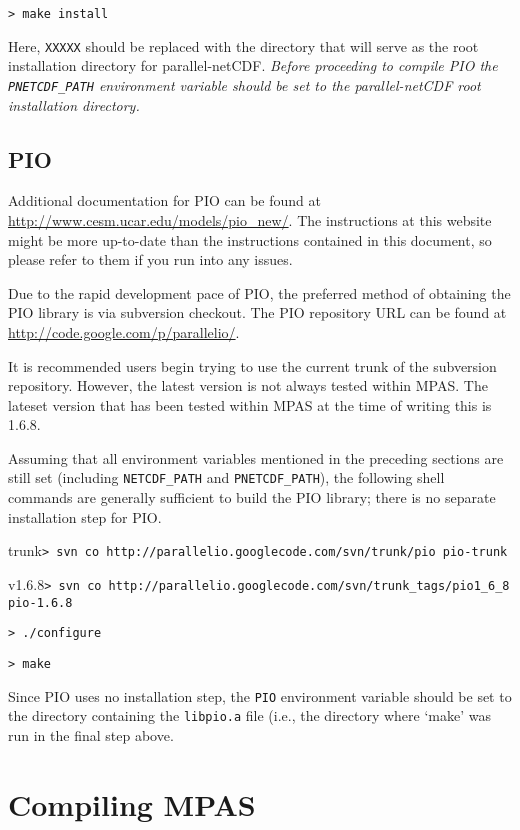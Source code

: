 {\tt > make install}
\vspace{12pt}

Here, {\tt XXXXX} should be replaced with the directory that will serve as the root installation directory for parallel-netCDF.
{\em Before proceeding to compile PIO the {\tt PNETCDF\_PATH} environment variable should be set to the parallel-netCDF root installation directory.}


\subsection{PIO}

Additional documentation for PIO can be found at
\url{http://www.cesm.ucar.edu/models/pio_new/}. The instructions at this
website might be more up-to-date than the instructions contained in this
document, so please refer to them if you run into any issues.

Due to the rapid development pace of PIO, the preferred method of obtaining the PIO library is via subversion checkout. The PIO repository URL
can be found at \url{http://code.google.com/p/parallelio/}.

It is recommended users begin trying to use the current trunk of the subversion repository. However, the latest version is not always tested within MPAS. The lateset version that has been tested within MPAS at the time of writing this is 1.6.8.

Assuming that all environment variables mentioned in the preceding sections are
still set (including {\tt NETCDF\_PATH} and {\tt PNETCDF\_PATH}), the following
shell commands are generally sufficient to build the PIO library; there is no
separate installation step for PIO.

\vspace{12pt}
{trunk\tt > svn co http://parallelio.googlecode.com/svn/trunk/pio pio-trunk}

{v1.6.8\tt > svn co http://parallelio.googlecode.com/svn/trunk\_tags/pio1\_6\_8 pio-1.6.8}

{\tt > ./configure}

{\tt > make} 
\vspace{12pt}

Since PIO uses no installation step, the {\tt PIO} environment variable should be set to the directory containing the {\tt libpio.a} file (i.e., the directory where `make' was run in the final step above.


\section{Compiling MPAS}

